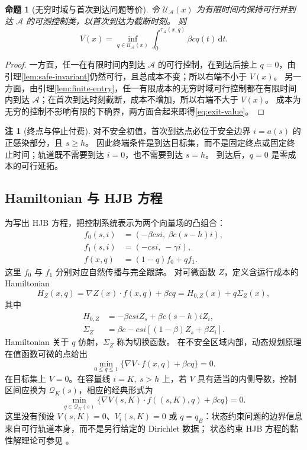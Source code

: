 \documentclass[11pt,a4paper,UTF8]{ctexart}
\newtheorem{proposition}[theorem]{命题}
\theoremstyle{definition}
\newtheorem{remark}[theorem]{注}
\newcommand{\Acal}{\mathcal A}
\newcommand{\dd}{\,\mathrm d}
\begin{document}
\begin{proposition}[无穷时域与首次到达问题等价]
\label{prop:exit-equivalence}
令 $\mathcal U_{\Acal}(x)$ 为有限时间内保持可行并到达 $\Acal$ 的可测控制类，以首次到达为截断时刻。
则
\begin{equation}
V(x)=\inf_{q\in\mathcal U_{\Acal}(x)}
\int_0^{\tau_{\Acal}(x,q)}\beta cq(t)\dd t.
\label{eq:exit-value}
\end{equation}
\end{proposition}
\begin{proof}
一方面，任一在有限时间内到达 $\Acal$ 的可行控制，在到达后接上 $q=0$，由引理\ref{lem:safe-invariant}仍然可行，且总成本不变；所以右端不小于 $V(x)$。
另一方面，由引理\ref{lem:finite-entry}，任一有限成本的无穷时域可行控制都在有限时间内到达 $\Acal$；在首次到达时刻截断，成本不增加，所以右端不大于 $V(x)$。
成本为无穷的控制不影响有限的下确界，两方面合起来即得\eqref{eq:exit-value}。
\end{proof}
\begin{remark}[终点与停止付费]
对不安全初值，首次到达点必位于安全边界 $i=a(s)$ 的正感染部分，且 $s\ge h$。
因此终端条件是到达目标集，而不是固定终点或固定终止时间；轨道既不需要到达 $i=0$，也不需要到达 $s=h$。
到达后，$q=0$ 是零成本的可行延拓。
\end{remark}

\subsection{Hamiltonian 与 HJB 方程}
\label{sec:HJB}
为写出 HJB 方程，把控制系统表示为两个向量场的凸组合：
\begin{align}
f_0(s,i)&=(-\beta csi,\ \beta c(s-h)i),\label{eq:f0}\\
f_1(s,i)&=(-csi,\ -\gamma i),\label{eq:f1}\\
f(x,q)&=(1-q)f_0+qf_1.\label{eq:control-affine}
\end{align}
这里 $f_0$ 与 $f_1$ 分别对应自然传播与完全跟踪。
对可微函数 $Z$，定义含运行成本的 Hamiltonian
\begin{equation}
H_Z(x,q)=\nabla Z(x)\cdot f(x,q)+\beta cq
=H_{0,Z}(x)+q\Sigma_Z(x),
\label{eq:H-affine}
\end{equation}
其中
\begin{align}
H_{0,Z}&=-\beta csiZ_s+\beta c(s-h)iZ_i,\label{eq:H0}\\
\Sigma_Z&=\beta c-csi[(1-\beta)Z_s+\beta Z_i].\label{eq:switching-function}
\end{align}
Hamiltonian 关于 $q$ 仿射，$\Sigma_Z$ 称为切换函数。
在不安全区域内部，动态规划原理在值函数可微的点给出
\begin{equation}
\min_{0\le q\le1}\{\nabla V\cdot f(x,q)+\beta cq\}=0.
\label{eq:HJB}
\end{equation}
在目标集上 $V=0$。在容量线 $i=K,\ s>h$ 上，若 $V$ 具有适当的内侧导数，控制区间应换为 $\mathcal Q_K(s)$，相应的经典形式为
\begin{equation}
\min_{q\in \mathcal Q_K(s)}\{\nabla V(s,K)\cdot f((s,K),q)+\beta cq\}=0.
\label{eq:boundary-HJB}
\end{equation}
这里没有预设 $V(s,K)=0$、$V_i(s,K)=0$ 或 $q=q_B$：状态约束问题的边界信息来自可行轨道本身，而不是另行给定的 Dirichlet 数据；
状态约束 HJB 方程的黏性解理论可参见 \citet{Soner1986}。
\end{document}
